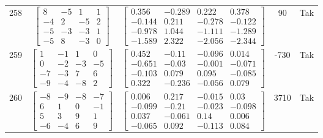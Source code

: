 \documentclass[a4paper,12pt]{article}
\begin{document}
\begin{tabular}{c c c c c}
258
&
$\begin{bmatrix} 8 & -5 & 1 & 1 \\ -4 & 2 & -5 & 2 \\ -5 & -3 & -3 & 1 \\ -5 & 8 & -3 & 0 \end{bmatrix}$
&
$\begin{bmatrix} 0.356 & -0.289 & 0.222 & 0.378 \\ -0.144 & 0.211 & -0.278 & -0.122 \\ -0.978 & 1.044 & -1.111 & -1.289 \\ -1.589 & 2.322 & -2.056 & -2.344 \end{bmatrix}$
&
90
&
Tak
\\
259
&
$\begin{bmatrix} 1 & -1 & 1 & 0 \\ 0 & -2 & -3 & -5 \\ -7 & -3 & 7 & 6 \\ -9 & -4 & -8 & 2 \end{bmatrix}$
&
$\begin{bmatrix} 0.452 & -0.11 & -0.096 & 0.014 \\ -0.651 & -0.03 & -0.001 & -0.071 \\ -0.103 & 0.079 & 0.095 & -0.085 \\ 0.322 & -0.236 & -0.056 & 0.079 \end{bmatrix}$
&
-730
&
Tak
\\
260
&
$\begin{bmatrix} -8 & -9 & -8 & -7 \\ 6 & 1 & 0 & -1 \\ 5 & 3 & 9 & 1 \\ -6 & -4 & 6 & 9 \end{bmatrix}$
&
$\begin{bmatrix} 0.006 & 0.217 & -0.015 & 0.03 \\ -0.099 & -0.21 & -0.023 & -0.098 \\ 0.037 & -0.061 & 0.14 & 0.006 \\ -0.065 & 0.092 & -0.113 & 0.084 \end{bmatrix}$
&
3710
&
Tak
\\
\end{tabular} \egroup \newpage
\end{document}

